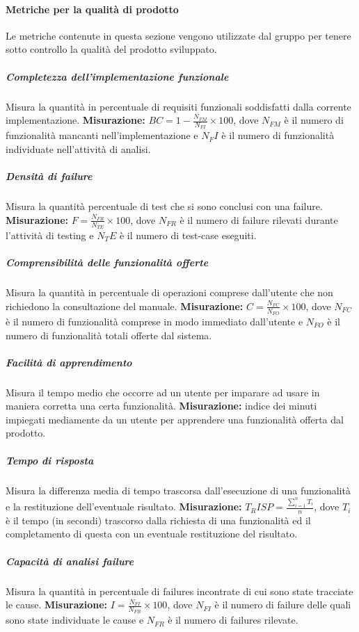 \paragraph{Metriche per la qualità di prodotto}	\Spazio
Le metriche contenute in questa sezione vengono utilizzate dal gruppo per tenere sotto controllo la qualità del prodotto sviluppato.

\subparagraph{Completezza dell'implementazione funzionale}\Spazio
Misura la quantità in percentuale di requisiti funzionali soddisfatti dalla corrente implementazione.
\textbf{Misurazione:}  $BC=1-\frac{N_{FM}}{N_{FI}}\times 100$, dove $N_{FM}$  è il numero di funzionalità mancanti nell'implementazione e $N_FI$ è il numero di funzionalità individuate nell'attività di analisi.

\subparagraph{Densità di failure} \Spazio
Misura la quantità percentuale di test che si sono conclusi con una failure.
\textbf{Misurazione:} $F=\frac{N_{FR}}{N_{TE}}\times 100$, dove $N_{FR}$ è il numero di failure rilevati durante l'attività di testing e ${N_TE}$ è il numero di test-case eseguiti.

\subparagraph{Comprensibilità delle funzionalità offerte} \Spazio 
Misura la quantità in percentuale di operazioni comprese dall'utente che non richiedono la consultazione del manuale.
\textbf{Misurazione:} $C=\frac{N_{FC}}{N_{FO}}\times 100$, dove $N_{FC}$ è il numero di funzionalità comprese in modo immediato dall'utente e $N_{FO}$ è il numero di funzionalità totali offerte dal sistema.
 
\subparagraph{Facilità di apprendimento} \Spazio 
Misura il tempo medio che occorre ad un utente per imparare ad usare in maniera corretta una certa funzionalità.
\textbf{Misurazione:} indice dei minuti impiegati mediamente da un utente per apprendere una funzionalità offerta dal prodotto.

\subparagraph{Tempo di risposta} \Spazio
Misura la differenza media di tempo trascorsa dall’esecuzione di una funzionalità e la restituzione dell’eventuale risultato.
\textbf{Misurazione:} $T_RISP=\frac{\sum\limits_{i=1}^n {T_i }}{n}$, dove $T_i$ è il tempo (in secondi) trascorso dalla richiesta di una funzionalità ed il completamento di questa con un eventuale restituzione del risultato.

\subparagraph{Capacità di analisi failure} \Spazio
Misura la quantità in percentuale di failures incontrate di cui sono state tracciate le cause.
\textbf{Misurazione:} $I=\frac{N_{FI}}{N_{FR}}\times 100 $, dove $N_{FI}$ è il numero di failure delle quali sono state individuate le cause e $N_{FR}$ è il numero di failures rilevate.

